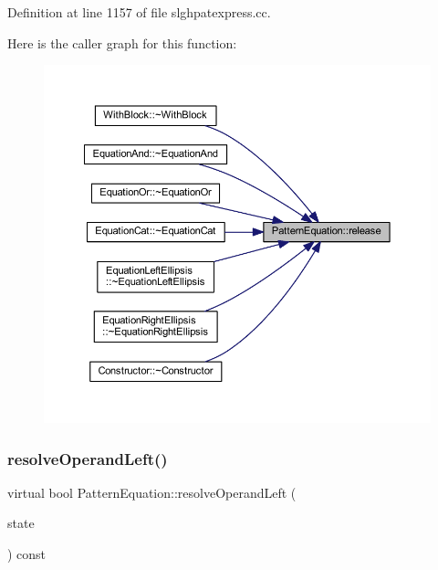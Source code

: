 Definition at line 1157 of file slghpatexpress.\+cc.

Here is the caller graph for this function\+:
\nopagebreak
\begin{figure}[H]
\begin{center}
\leavevmode
\includegraphics[width=350pt]{class_pattern_equation_ab810cb4b0638eb2d9413a3d17af56c11_icgraph}
\end{center}
\end{figure}
\mbox{\label{class_pattern_equation_a16e885a945df91e3daf2dea6394ae6f2}} 
\subsubsection{\texorpdfstring{resolveOperandLeft()}{resolveOperandLeft()}}
{\footnotesize\ttfamily virtual bool Pattern\+Equation\+::resolve\+Operand\+Left (\begin{DoxyParamCaption}\item[{\mbox{\hyperlink{struct_operand_resolve}{Operand\+Resolve}} \&}]{state }\end{DoxyParamCaption}) const\hspace{0.3cm}{\ttfamily [pure virtual]}}



